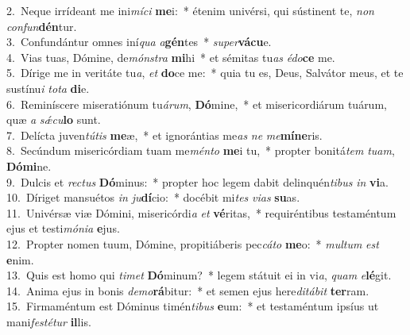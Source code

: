 {2.~}Neque irrídeant me ini\textit{mí}\textit{ci} \textbf{me}i:~* étenim univérsi, qui sústinent te, \textit{non} \textit{con}\textit{fun}\textbf{dén}tur.\\
{3.~}Confundántur omnes iní\textit{qua} \textit{a}\textbf{gén}tes~* \textit{su}\textit{per}\textbf{vá}\textbf{cu}e.\\
{4.~}Vias tuas, Dómine, de\textit{món}\textit{stra} \textbf{mi}hi~* et sémitas tu\textit{as} \textit{é}\textit{do}\textbf{ce} me.\\
{5.~}Dírige me in veritáte tu\textit{a}, \textit{et} \textbf{do}ce me:~* quia tu es, Deus, Salvátor meus, et te sustínu\textit{i} \textit{to}\textit{ta} \textbf{di}e.\\
{6.~}Reminíscere miseratiónum tu\textit{á}\textit{rum}, \textbf{Dó}mine,~* et misericordiárum tuárum, quæ \textit{a} \textit{sǽ}\textit{cu}\textbf{lo} sunt.\\
{7.~}Delícta juven\textit{tú}\textit{tis} \textbf{me}æ,~* et ignorántias me\textit{as} \textit{ne} \textit{me}\textbf{mí}\textbf{ne}ris.\\
{8.~}Secúndum misericórdiam tuam me\textit{mén}\textit{to} \textbf{me}i tu,~* propter bonitá\textit{tem} \textit{tu}\textit{am}, \textbf{Dó}\textbf{mi}ne.\\
{9.~}Dulcis et \textit{re}\textit{ctus} \textbf{Dó}minus:~* propter hoc legem dabit delinquén\textit{ti}\textit{bus} \textit{in} \textbf{vi}a.\\
{10.~}Díriget mansuétos \textit{in} \textit{ju}\textbf{dí}cio:~* docébit mi\textit{tes} \textit{vi}\textit{as} \textbf{su}as.\\
{11.~}Univérsæ viæ Dómini, misericórdi\textit{a} \textit{et} \textbf{vé}ritas,~* requiréntibus testaméntum ejus et testi\textit{mó}\textit{ni}\textit{a} \textbf{e}jus.\\
{12.~}Propter nomen tuum, Dómine, propitiáberis pec\textit{cá}\textit{to} \textbf{me}o:~* \textit{mul}\textit{tum} \textit{est} \textbf{e}nim.\\
{13.~}Quis est homo qui \textit{ti}\textit{met} \textbf{Dó}minum?~* legem státuit ei in vi\textit{a}, \textit{quam} \textit{e}\textbf{lé}git.\\
{14.~}Anima ejus in bonis \textit{de}\textit{mo}\textbf{rá}bitur:~* et semen ejus here\textit{di}\textit{tá}\textit{bit} \textbf{ter}ram.\\
{15.~}Firmaméntum est Dóminus timén\textit{ti}\textit{bus} \textbf{e}um:~* et testaméntum ipsíus ut mani\textit{fe}\textit{sté}\textit{tur} \textbf{il}lis.\\
